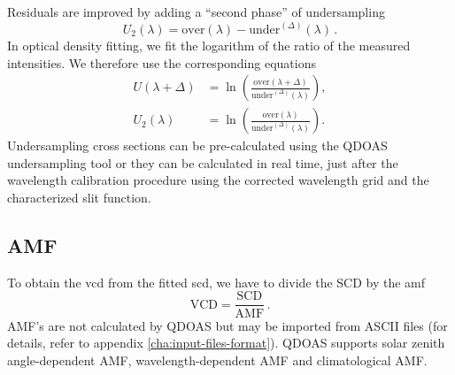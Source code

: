 Residuals are improved by adding a “second phase” of undersampling
\begin{equation}
  \label{eq:undersampling2}
  U_2(\lambda) = \mathrm{over}(\lambda) - \mathrm{under}^{(\Delta)}(\lambda)\,.
\end{equation}
In optical density fitting, we fit the logarithm of the ratio of the
measured intensities.  We therefore use the corresponding equations
\begin{align}
  \label{eq:undersampling_doas}
  U(\lambda+\Delta) & = \ln\left(\frac{\mathrm{over}(\lambda+\Delta)}{\mathrm{under}^{(\Delta)}(\lambda)}\right), \\
  U_2(\lambda) & = \ln\left(\frac{\mathrm{over}(\lambda)}{\mathrm{under}^{(\Delta)}(\lambda)}\right).
\end{align}
Undersampling cross sections can be pre-calculated using the QDOAS
undersampling tool or they can be calculated in real time, just after
the wavelength calibration procedure using the corrected wavelength
grid and the characterized slit function.

\subsection{AMF}\label{sec:amf}
To obtain the \gls{vcd} from the fitted \gls{scd}, we have to divide
the SCD by the \gls{amf}
\begin{equation}
  \label{eq:air_mass_factor}
  \mathrm{VCD} = \frac{\mathrm{SCD}}{\mathrm{AMF}}\,.
\end{equation}
AMF's are not calculated by QDOAS but may be imported from ASCII files
(for details, refer to appendix \ref{cha:input-files-format}). QDOAS
supports solar zenith angle-dependent AMF, wavelength-dependent AMF
and climatological AMF.

